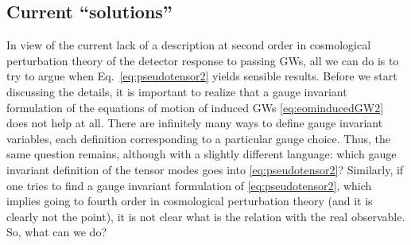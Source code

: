 \documentclass[a4paper,11pt]{article}
\numberwithin{equation}{section}
\begin{document}
\subsection{Current ``solutions''\label{sec:gaugesol}}

In view of the current lack of a description at second order in cosmological perturbation theory of the detector response to passing GWs, all we can do is to try to argue when Eq.~\eqref{eq:pseudotensor2} yields sensible results. Before we start discussing the details, it is important to realize that a gauge invariant formulation of the equations of motion of induced GWs \eqref{eq:eominducedGW2} does not help at all. There are infinitely many ways to define gauge invariant variables, each definition corresponding to a particular gauge choice. Thus, the same question remains, although with a slightly different language: which gauge invariant definition of the tensor modes goes into \eqref{eq:pseudotensor2}? Similarly, if one tries to find a gauge invariant formulation of \eqref{eq:pseudotensor2}, which implies going to fourth order in cosmological perturbation theory (and it is clearly not the point), it is not clear what is the relation with the real observable. So, what can we do?
\end{document}
